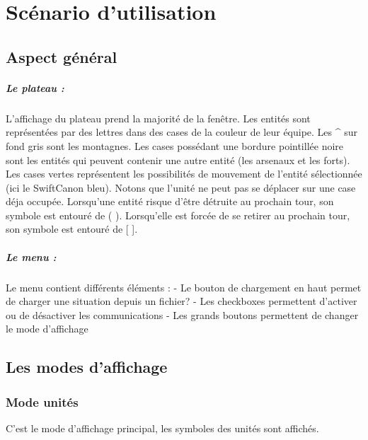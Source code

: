 \chapter{Scénario d'utilisation}

	\section{Aspect général}

		
		\paragraph{Le plateau :}
			L'affichage du plateau prend la majorité de la fenêtre.
			Les entités sont représentées par des lettres dans des cases de la couleur de leur équipe.
			Les \^{} sur fond gris sont les montagnes.
			Les cases possédant une bordure pointillée noire sont les entités qui peuvent contenir une autre entité	(les arsenaux et les forts).
			Les cases vertes représentent les possibilités de mouvement	de l'entité sélectionnée (ici le SwiftCanon bleu). 
			Notons que l'unité ne peut pas se déplacer sur une case déja occupée.
			Lorsqu'une entité risque d'être détruite au prochain tour, son symbole est entouré de ( ).
			Lorsqu'elle est forcée de se retirer au prochain tour, son symbole est entouré de [ ].
	
		\paragraph{Le menu :}
	
			Le menu contient différents éléments :
			- Le bouton de chargement en haut permet de charger une situation depuis un fichier?
			- Les checkboxes permettent d'activer ou de désactiver les communications
			- Les grands boutons permettent de changer le mode d'affichage

	\section{Les modes d'affichage}

		\subsection{Mode unités}
			C'est le mode d'affichage principal, les symboles des unités sont affichés.


